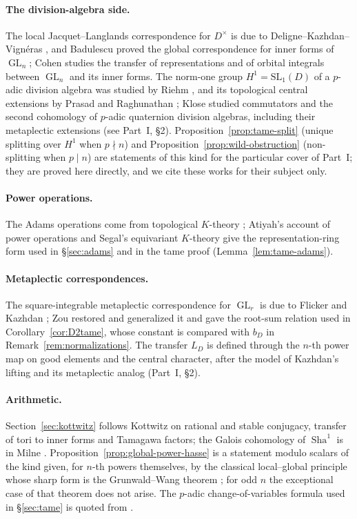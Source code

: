 \documentclass[11pt]{article}
\newcommand{\GL}{\operatorname{GL}}
\newcommand{\Sha}{\operatorname{Sha}}
\theoremstyle{plain}
\theoremstyle{definition}
\begin{document}
\paragraph{The division-algebra side.} The local Jacquet--Langlands correspondence for $D^\times$ is due to Deligne--Kazhdan--Vign\'eras \cite{DKV}, and Badulescu \cite{Badulescu} proved the global correspondence for inner forms of $\GL_n$; Cohen \cite{Cohen} studies the transfer of representations and of orbital integrals between $\GL_n$ and its inner forms. The norm-one group $H^1=\mathrm{SL}_1(D)$ of a $p$-adic division algebra was studied by Riehm \cite{Riehm70}, and its topological central extensions by Prasad and Raghunathan \cite{PrasadRaghunathan88}; Klose \cite{Klose86} studied commutators and the second cohomology of $p$-adic quaternion division algebras, including their metaplectic extensions (see Part~I, \S2). Proposition~\ref{prop:tame-split} (unique splitting over $H^1$ when $p\nmid n$) and Proposition~\ref{prop:wild-obstruction} (non-splitting when $p\mid n$) are statements of this kind for the particular cover of Part~I; they are proved here directly, and we cite these works for their subject only.

\paragraph{Power operations.} The Adams operations come from topological $K$-theory \cite{Adams62}; Atiyah's account of power operations \cite{Atiyah66} and Segal's equivariant $K$-theory \cite{SegalK} give the representation-ring form used in \S\ref{sec:adams} and in the tame proof (Lemma~\ref{lem:tame-adams}).

\paragraph{Metaplectic correspondences.} The square-integrable metaplectic correspondence for $\GL_r$ is due to Flicker and Kazhdan \cite{FK86}; Zou \cite{Zou} restored and generalized it and gave the root-sum relation used in Corollary~\ref{cor:D2tame}, whose constant is compared with $b_D$ in Remark~\ref{rem:normalizations}. The transfer $L_D$ is defined through the $n$-th power map on good elements and the central character, after the model of Kazhdan's lifting and its metaplectic analog (Part~I, \S2).

\paragraph{Arithmetic.} Section~\ref{sec:kottwitz} follows Kottwitz \cite{Kottwitz84} on rational and stable conjugacy, transfer of tori to inner forms and Tamagawa factors; the Galois cohomology of $\Sha^1$ is in Milne \cite{MilneADT}. Proposition~\ref{prop:global-power-hasse} is a statement modulo scalars of the kind given, for $n$-th powers themselves, by the classical local--global principle whose sharp form is the Grunwald--Wang theorem \cite[Ch.~X]{ArtinTate}; for odd $n$ the exceptional case of that theorem does not arise. The $p$-adic change-of-variables formula used in \S\ref{sec:tame} is quoted from \cite{Loeser}.
\end{document}
